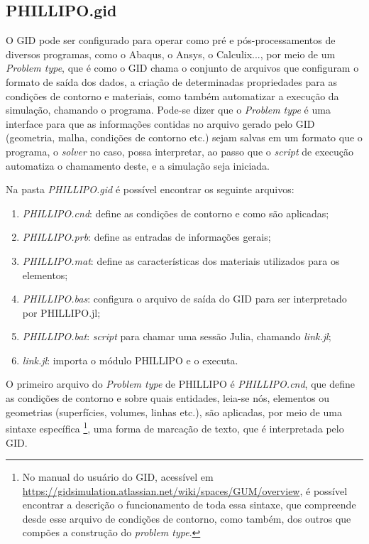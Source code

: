 \subsection{PHILLIPO.gid}

O GID pode ser configurado para operar como pré e pós-processamentos de diversos programas, como o Abaqus, o Ansys, o Calculix..., por meio de um \emph{Problem type}, que é como o GID chama o conjunto de arquivos que configuram o formato de saída dos dados, a criação de determinadas propriedades para as condições de contorno e materiais, como também automatizar a execução da simulação, chamando o programa. Pode-se dizer que o \emph{Problem type} é uma interface para que as informações contidas no arquivo gerado pelo GID (geometria, malha, condições de contorno etc.) sejam salvas em um formato que o programa, o \emph{solver} no caso, possa interpretar, ao passo que o \emph{script} de execução automatiza o chamamento deste, e a simulação seja iniciada. 

Na pasta \emph{PHILLIPO.gid} é possível encontrar os seguinte arquivos:

\begin{enumerate}
    \item \emph{PHILLIPO.cnd}: define as condições de contorno e como são aplicadas;
    \item \emph{PHILLIPO.prb}: define as entradas de informações gerais;
    \item \emph{PHILLIPO.mat}: define as características dos materiais utilizados para os elementos;
    \item \emph{PHILLIPO.bas}: configura o arquivo de saída do GID para ser interpretado por PHILLIPO.jl;
    \item \emph{PHILLIPO.bat}: \emph{script} para chamar uma sessão Julia, chamando \emph{link.jl};
    \item \emph{link.jl}: importa o módulo PHILLIPO e o executa.
\end{enumerate}

O primeiro arquivo do \emph{Problem type} de PHILLIPO é \emph{PHILLIPO.cnd}, que define as condições de contorno e sobre quais entidades, leia-se nós, elementos ou geometrias (superfícies, volumes, linhas etc.), são aplicadas, por meio de uma sintaxe específica \footnote{No manual do usuário do GID, acessível em \url{https://gidsimulation.atlassian.net/wiki/spaces/GUM/overview}, é possível encontrar a descrição o funcionamento de toda essa sintaxe, que compreende desde esse arquivo de condições de contorno, como também, dos outros que compões a construção do \emph{problem type}.}, uma forma de marcação de texto, que é interpretada pelo GID.


